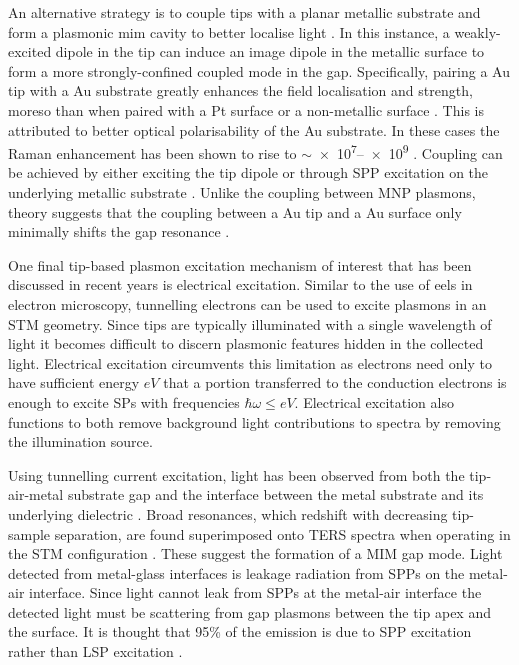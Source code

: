 \documentclass{article}
\begin{document}
An alternative strategy is to couple tips with a planar metallic substrate and form a plasmonic \gls{mim} cavity to better localise light \cite{ren2004, neacsu2006, hayazawa2007, yano2007, pettinger2009, uetsuki2012, lindquist2013}. In this instance, a weakly-excited dipole in the tip can induce an image dipole in the metallic surface to form a more strongly-confined coupled mode in the gap. Specifically, pairing a Au tip with a Au substrate greatly enhances the field localisation and strength, moreso than when paired with a Pt surface \cite{ren2004} or a non-metallic surface \cite{downes2006}. This is attributed to better optical polarisability of the Au substrate. In these cases the Raman enhancement has been shown to rise to $\sim$\num{e7}--\num{e9} \cite{uetsuki2012}. Coupling can be achieved by either exciting the tip dipole or through SPP excitation on the underlying metallic substrate \cite{hayazawa2007, uetsuki2012}. Unlike the coupling between MNP plasmons, theory suggests that the coupling between a Au tip and a Au surface only minimally shifts the gap resonance \cite{downes2006}. %

One final tip-based plasmon excitation mechanism of interest that has been discussed in recent years is electrical excitation. Similar to the use of \gls{eels} in electron microscopy, tunnelling electrons can be used to excite plasmons in an STM geometry. Since tips are typically illuminated with a single wavelength of light it becomes difficult to discern plasmonic features hidden in the collected light. Electrical excitation circumvents this limitation as electrons need only to have sufficient energy $eV$ that a portion transferred to the conduction electrons is enough to excite SPs with frequencies $\hbar\omega \leq eV$. Electrical excitation also functions to both remove background light contributions to spectra by removing the illumination source.

Using tunnelling current excitation, light has been observed from both the tip-air-metal substrate gap \cite{pettinger2007, pettinger2009} and the interface between the metal substrate and its underlying dielectric \cite{wang2011}. Broad resonances, which redshift with decreasing tip-sample separation, are found superimposed onto TERS spectra when operating in the STM configuration \cite{pettinger2007, pettinger2009}. These suggest the formation of a MIM gap mode. Light detected from metal-glass interfaces is leakage radiation from SPPs on the metal-air interface. Since light cannot leak from SPPs at the metal-air interface the detected light must be scattering from gap plasmons between the tip apex and the surface. It is thought that 95\% of the emission is due to SPP excitation rather than LSP excitation \cite{wang2011}.
\end{document}
